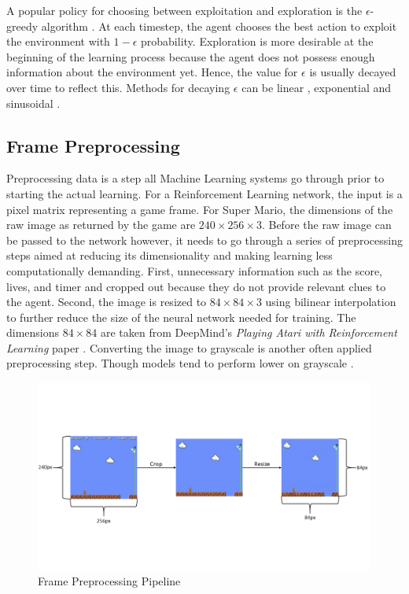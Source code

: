 \documentclass[notitlepage,a4paper,11pt]{article}
\begin{document}
A popular policy for choosing between exploitation and exploration is the $\epsilon$-greedy algorithm \cite{white2012bandit}. At each timestep, the agent chooses the best action to exploit the environment with $1-\epsilon$ probability. Exploration is more desirable at the beginning of the learning process because the agent does not possess enough information about the environment yet. Hence, the value for $\epsilon$ is usually decayed over time to reflect this. Methods for decaying $\epsilon$ can be linear \cite{mnih2015human}, exponential \cite{maroti2019rbed} and sinusoidal  \cite{chuchro2017game}.


\subsection{Frame Preprocessing}
Preprocessing data is a step all Machine Learning systems go through prior to starting the actual learning. For a Reinforcement Learning network, the input is a pixel matrix representing a game frame. For Super Mario, the dimensions of the raw image as returned by the game are $240 \times 256 \times 3$. Before the raw image can be passed to the network however, it needs to go through a series of preprocessing steps aimed at reducing its dimensionality and making learning less computationally demanding. First, unnecessary information such as the score, lives, and timer and cropped out because they do not provide relevant clues to the agent. Second, the image is resized to $84 \times 84 \times 3$ using bilinear interpolation \cite{gribbon2004novel} to further reduce the size of the neural network needed for training. The dimensions $84 \times 84$ are taken from DeepMind's \textit{Playing Atari with Reinforcement Learning} paper \cite{DBLP:journals/corr/MnihKSGAWR13}. Converting the image to grayscale is another often applied preprocessing step. Though models tend to perform lower on grayscale \cite{lample2017playing}.

\begin{figure}[!htb]
\centering
\includegraphics[trim={0 4.5cm 0 5cm},clip,width=1\linewidth]{figs/frame_preprocessing.png}
\caption{Frame Preprocessing Pipeline}
\end{figure}
\end{document}
